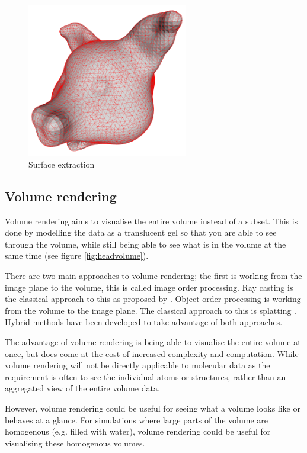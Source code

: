 \begin{figure}[h!]
  \begin{center}
    \includegraphics[width=70mm]{triangulated_mesh}
  \end{center}
  \caption{Surface extraction}
  \label{fig:triangulatedmesh}
\end{figure}


\subsection{Volume rendering}
\label{sub:volume_rendering}

Volume rendering aims to visualise the entire volume instead of a subset. This
is done by modelling the data as a translucent gel so that you are able to see
through the volume, while still being able to see what is in the volume at the
same time (see figure \ref{fig:headvolume}).

There are two main approaches to volume rendering; the first is working from the
image plane to the volume, this is called image order processing. Ray casting is
the classical approach to this as proposed by \citet{levoy88}. Object order
processing is working from the volume to the image plane. The classical approach
to this is splatting \citep{westover89}. Hybrid methods have been developed to
take advantage of both approaches.

The advantage of volume rendering is being able to visualise the entire volume
at once, but does come at the cost of increased complexity and computation.
While volume rendering will not be directly applicable to molecular data as the
requirement is often to see the individual atoms or structures, rather than an
aggregated view of the entire volume data.

However, volume rendering could be useful for seeing what a volume looks like
or behaves at a glance. For simulations where large parts of the volume are
homogenous (e.g. filled with water), volume rendering could be useful for
visualising these homogenous volumes.


